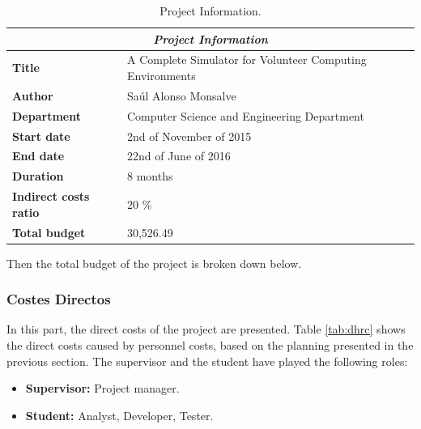 \begin{center}
\begin{table}[htbp]
\centering
\begin{tabular}{@{}p{3.5cm} p{9cm}@{}} 
\toprule
\multicolumn{2}{c}{\textbf{\textit{Project Information}}}\\
\midrule
\textbf{Title} 					& A Complete Simulator for Volunteer Computing Environments \\
\midrule
\textbf{Author} 					& Saúl Alonso Monsalve \\
\midrule
\textbf{Department} 				& Computer Science and Engineering Department \\
\midrule
\textbf{Start date}				& 2nd of November of 2015 \\
\midrule
\textbf{End date}				& 22nd of June of 2016 \\
\midrule
\textbf{Duration} 				& 8 months \\
\midrule
\textbf{Indirect costs ratio} 	& 20 \% \\
\midrule
\textbf{Total budget} 			& 30,526.49 \\
\bottomrule
\end{tabular}
\caption{Project Information.}
\label{tab:project_information}
\end{table}
\end{center}

Then the total budget of the project is broken down below.

\subsubsection{Costes Directos}

In this part, the direct costs of the project are presented. Table \ref{tab:dhrc} shows the direct costs caused by personnel costs, based on the planning presented in the previous section. The supervisor and the student have played the following roles:

\begin{itemize}

\item \textbf{Supervisor:} Project manager.

\item \textbf{Student:} Analyst, Developer, Tester.

\end{itemize} 

